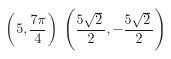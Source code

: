 { $\left( 5, \dfrac{7\pi}{4} \right)$ \label{polartorectfirst} }
{ $\left( \dfrac{5\sqrt{2}}{2}, -\dfrac{5\sqrt{2}}{2} \right)$}
